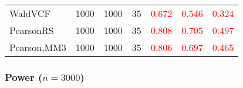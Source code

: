 \documentclass[
]{article}
\begin{document}
\begin{table}[H]
{\begin{tabular}[t]{lrrrrrr}
\hspace{1em}WaldVCF & 1000 & 1000 & 35 & \textcolor{red}{0.672} & \textcolor{red}{0.546} & \textcolor{red}{0.324}\\
\hspace{1em}PearsonRS & 1000 & 1000 & 35 & \textcolor{red}{0.808} & \textcolor{red}{0.705} & \textcolor{red}{0.497}\\
\hspace{1em}Pearson,MM3 & 1000 & 1000 & 35 & \textcolor{red}{0.806} & \textcolor{red}{0.697} & \textcolor{red}{0.465}\\
\bottomrule
\end{tabular}}
\endgroup{}
\end{table}

\hypertarget{power-n3000-1}{%
\subsubsection{\texorpdfstring{Power
(\(n=3000\))}{Power (n=3000)}}\label{power-n3000-1}}
\end{document}
